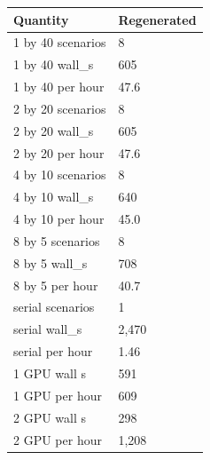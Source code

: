 \begin{tabular}{ll}
Quantity & Regenerated \\
\hline
1 by 40 scenarios & 8 \\
1 by 40 wall\_s & 605 \\
1 by 40 per hour & 47.6 \\
2 by 20 scenarios & 8 \\
2 by 20 wall\_s & 605 \\
2 by 20 per hour & 47.6 \\
4 by 10 scenarios & 8 \\
4 by 10 wall\_s & 640 \\
4 by 10 per hour & 45.0 \\
8 by 5 scenarios & 8 \\
8 by 5 wall\_s & 708 \\
8 by 5 per hour & 40.7 \\
serial scenarios & 1 \\
serial wall\_s & 2,470 \\
serial per hour & 1.46 \\
1 GPU wall s & 591 \\
1 GPU per hour & 609 \\
2 GPU wall s & 298 \\
2 GPU per hour & 1,208 \\
\end{tabular}
